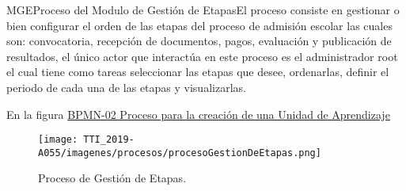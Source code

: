\pagebreak

\begin{BPMN}{MGE}{Proceso del Modulo de Gestión de Etapas}{El proceso consiste en gestionar o bien configurar el orden de las etapas del proceso de admisión escolar las cuales son: convocatoria, recepción de documentos, pagos, evaluación y publicación de resultados, el único actor que interactúa en este proceso es el administrador root el cual tiene como tareas seleccionar las etapas que desee, ordenarlas, definir el periodo de cada una de las etapas y visualizarlas.}
\end{BPMN}
En la figura \hyperref[fig:MGE]{BPMN-02 Proceso para la creación de una Unidad de Aprendizaje}

\begin{figure}[H]
        \centering
        \texttt{[image: TTI\_2019-A055/imagenes/procesos/procesoGestionDeEtapas.png]}
        \caption{Proceso de Gestión de Etapas.}
        \label{fig:MGE}
    \end{figure}

